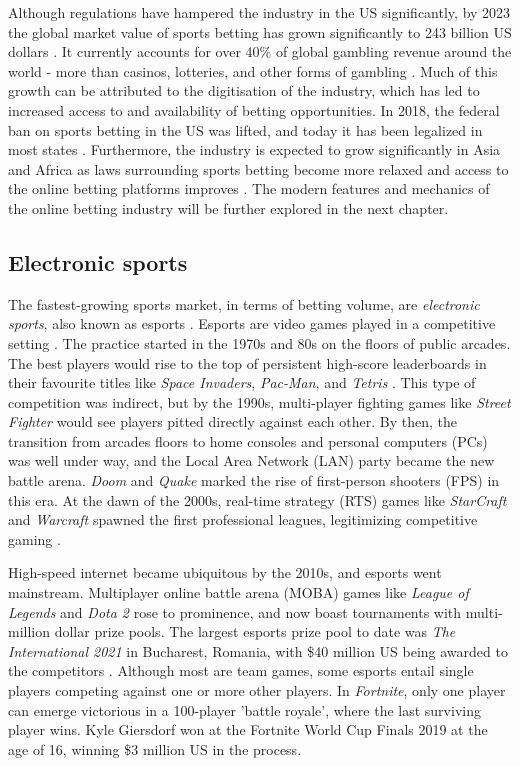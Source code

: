 Although regulations have hampered the industry in the US significantly, by 2023 the global market value of sports betting has grown significantly to 243 billion US dollars \cite{structuresportsbetting}. It currently accounts for over 40\% of global gambling revenue around the world - more than casinos, lotteries, and other forms of gambling \cite{sizesportsbetting}. Much of this growth can be attributed to the digitisation of the industry, which has led to increased access to and availability of betting opportunities. In 2018, the federal ban on sports betting in the US was lifted, and today it has been legalized in most states \cite{legalbettingtracker}. Furthermore, the industry is expected to grow significantly in Asia and Africa as laws surrounding sports betting become more relaxed and access to the online betting platforms improves \cite{structuresportsbetting}. The modern features and mechanics of the online betting industry will be further explored in the next chapter.

\subsection{Electronic sports}

The fastest-growing sports market, in terms of betting volume, are \textit{electronic sports}, also known as esports \cite{sizesportsbetting}. Esports are video games played in a competitive setting \cite{arcade}. The practice started in the 1970s and 80s on the floors of public arcades. The best players would rise to the top of persistent high-score leaderboards in their favourite titles like \textit{Space Invaders}, \textit{Pac-Man}, and \textit{Tetris} \cite{economicsjournalesports}. This type of competition was indirect, but by the 1990s, multi-player fighting games like \textit{Street Fighter} would see players pitted directly against each other. By then, the transition from arcades floors to home consoles and personal computers (PCs) was well under way, and the Local Area Network (LAN) party became the new battle arena. \textit{Doom} and \textit{Quake} marked the rise of first-person shooters (FPS) in this era. At the dawn of the 2000s, real-time strategy (RTS) games like \textit{StarCraft} and \textit{Warcraft} spawned the first professional leagues, legitimizing competitive gaming \cite{koreasports}.

High-speed internet became ubiquitous by the 2010s, and esports went mainstream. Multiplayer online battle arena (MOBA) games like \textit{League of Legends} and \textit{Dota 2} rose to prominence, and now boast tournaments with multi-million dollar prize pools. The largest esports prize pool to date was \textit{The International 2021} in Bucharest, Romania, with \$40 million US being awarded to the competitors \cite{growthofesports}. Although most are team games, some esports entail single players competing against one or more other players. In \textit{Fortnite}, only one player can emerge victorious in a 100-player 'battle royale', where the last surviving player wins. Kyle Giersdorf won at the Fortnite World Cup Finals 2019 at the age of 16, winning \$3 million US in the process. 

